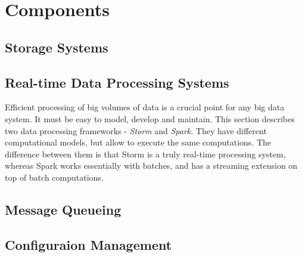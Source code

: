 \chapter{Components}
\label{chap:components}

\section{Storage Systems}





\section{Real-time Data Processing Systems}

Efficient processing of big volumes of data is a crucial point for any big data system.
It must be easy to model, develop and maintain.
This section describes two data processing frameworks - \textit{Storm} and \textit{Spark}.
They have different computational models, but allow to execute the same computations.
The difference between them is that Storm is a truly real-time processing system, whereas Spark works essentially with batches, and has a streaming extension on top of batch computations.




\section{Message Queueing}






\section{Configuraion Management}

